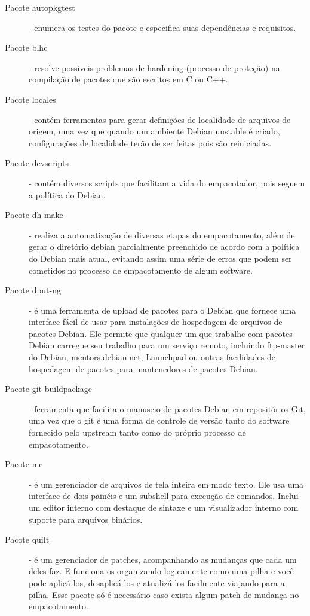 \begin{description}
	\item[Pacote autopkgtest] - enumera os testes do pacote e especifica suas dependências e requisitos.
	\item[Pacote blhc] - resolve possíveis problemas de hardening %
	 (processo de proteção) na compilação de pacotes que são escritos em C ou C++.
	\item[Pacote locales] - contém ferramentas para gerar definições de localidade de arquivos de origem, uma vez que quando um ambiente Debian unstable é criado, configurações de localidade terão de ser feitas pois são reiniciadas. %
	\item[Pacote devscripts] - contém diversos scripts que facilitam a vida do empacotador, pois seguem a política do Debian.
	\item[Pacote dh-make] - realiza a automatização de diversas etapas do empacotamento, além de gerar o diretório debian parcialmente preenchido de acordo com a política do Debian mais atual, evitando assim uma série de erros que podem ser cometidos no processo de empacotamento de algum software.
	\item[Pacote dput-ng] - é uma ferramenta de upload de pacotes para o Debian que fornece uma interface fácil de usar para instalações de hospedagem de arquivos de pacotes Debian. Ele permite que qualquer um que trabalhe com pacotes Debian carregue seu trabalho para um serviço remoto, incluindo ftp-master do Debian, mentors.debian.net, Launchpad ou outras facilidades de hospedagem de pacotes para mantenedores de pacotes Debian.
	\item[Pacote git-buildpackage] - ferramenta que facilita o manuseio de pacotes Debian em repositórios Git, uma vez que o git é uma forma de controle de versão tanto do software fornecido pelo upstream tanto como do próprio processo de empacotamento.%
	\item[Pacote mc] - é um gerenciador de arquivos de tela inteira em modo texto. Ele usa uma interface de dois painéis e um subshell para execução de comandos. Inclui um editor interno com destaque de sintaxe e um visualizador interno com suporte para arquivos binários.
	\item[Pacote quilt] - é um gerenciador de patches, %
	 acompanhando as mudanças que cada um deles faz. E funciona os organizando logicamente como uma pilha e você pode aplicá-los, desaplicá-los e atualizá-los facilmente viajando para a pilha. Esse pacote só é necessário caso exista algum patch de mudança no empacotamento.

\end{description}
